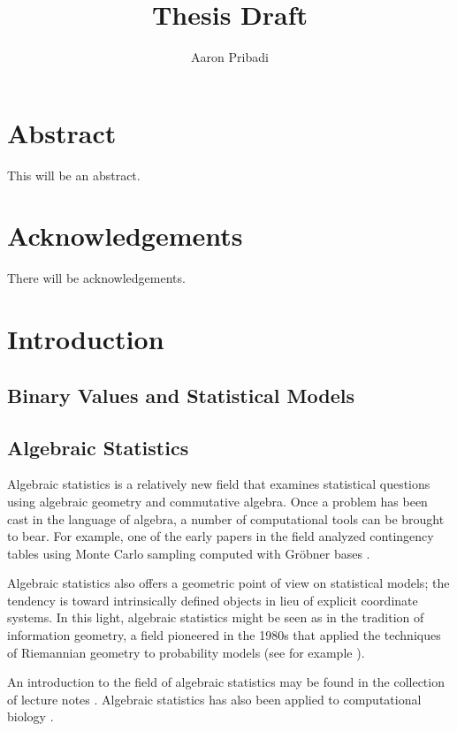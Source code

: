 \documentclass[cclicense]{hmcthesis}
\title{Thesis Draft}
\author{Aaron Pribadi}
\numberwithin{equation}{chapter}
\numberwithin{thmcounter}{chapter}
\begin{document}
\frontmatter

\maketitle

\tableofcontents


\chapter{Abstract}
    This will be an abstract.

\chapter{Acknowledgements}
    There will be acknowledgements.

\mainmatter

\chapter{Introduction}

\section{Binary Values and Statistical Models}

\section{Algebraic Statistics}

    Algebraic statistics is a relatively new field that examines statistical
    questions using algebraic geometry and commutative algebra.  Once a problem
    has been cast in the language of algebra, a number of computational tools
    can be brought to bear.  For example, one of the early papers in the field
    analyzed contingency tables using Monte Carlo sampling computed with Gröbner
    bases \citep{DS98}.

    Algebraic statistics also offers a geometric point of view on statistical
    models; the tendency is toward intrinsically defined objects in lieu of
    explicit coordinate systems.  In this light, algebraic statistics might be
    seen as in the tradition of information geometry, a field pioneered in the
    1980s that applied the techniques of Riemannian geometry to probability
    models (see for example \citep{Ama}).

    An introduction to the field of algebraic statistics may be found in the
    collection of lecture notes \citep{DSS08}.  Algebraic statistics has also
    been applied to computational biology \citep{ASCB}.
\end{document}
